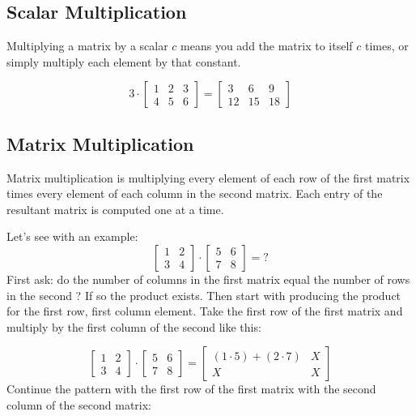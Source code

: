 \subsection{Scalar Multiplication}
\label{scalar-multiplication}

Multiplying a matrix by a scalar $c$ means you add the matrix to itself $c$ times, or simply multiply each element by that constant.

\begin{equation*}
3 \cdot
\begin{bmatrix}
1 & 2 & 3 \\
4 & 5 & 6
\end{bmatrix}
=
\begin{bmatrix}
3 & 6 & 9 \\
12 & 15 & 18
\end{bmatrix}
\end{equation*}

\subsection{Matrix Multiplication}
\label{matrix-multiplication}

Matrix multiplication is multiplying every element of each row of the first matrix times every element of each column in the second matrix. Each entry of the resultant matrix is computed one at a time.

Let's see with an example: 
\begin{equation*} 
\begin{bmatrix}
1 & 2 \\
3 & 4
\end{bmatrix}
\cdot
\begin{bmatrix}
5 & 6 \\
7 & 8
\end{bmatrix}
= ?
\end{equation*}
First ask: do the number of columns in the first matrix equal the number of rows in the second ? If so the product exists. Then start with producing the product for the first row, first column element. Take the first row of the first matrix and multiply by the first column of the second like this:

\begin{equation*} 
\begin{bmatrix}
1 & 2 \\
3 & 4
\end{bmatrix}
\cdot
\begin{bmatrix}
5 & 6 \\
7 & 8
\end{bmatrix}
=
\begin{bmatrix}
(1\cdot 5) + (2\cdot 7) & X \\
X & X
\end{bmatrix}
\end{equation*}
Continue the pattern with the first row of the first matrix with the second column of the second matrix:


